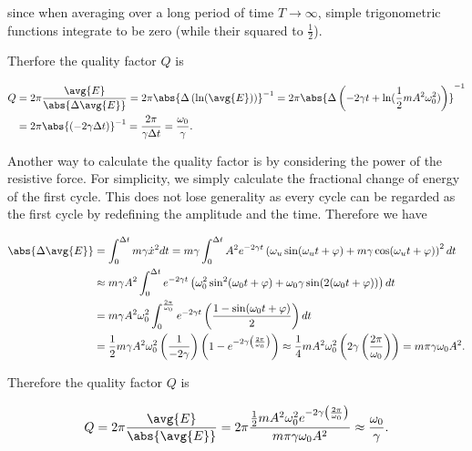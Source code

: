 \documentclass[english,a4paper,12pt]{report}
\begin{document}
since when averaging over a long period of time \(T \to \infty\), simple trigonometric functions integrate to be zero (while their squared to \(\frac{1}{2} \)). 

Therfore the quality factor \(Q\) is 

\begin{equation}
    \begin{aligned} 
    Q &= 2\pi \frac{\avg{E} }{\abs{\Delta \avg{E} } } = 2\pi  \abs{\Delta \left( \ln (\avg{E}  ) \right)}^{-1} = 2\pi \abs{ \Delta \left(-2\gamma t + \ln (\frac{1}{2}mA^2\omega _{0}^2  )\right)}^{-1}  \\
    &= 2\pi \abs{ (-2\gamma \Delta t)}^{-1} = \frac{2\pi }{\gamma \Delta t} = \frac{\omega _{0} }{\gamma }.   
    \end{aligned} 
\end{equation}

Another way to calculate the quality factor is by considering the power of the resistive force. For simplicity, we simply calculate the fractional change of energy of the first cycle. This does not lose generality as every cycle can be regarded as the first cycle by redefining the amplitude and the time. Therefore we have

\begin{equation}
    \begin{aligned} 
    \abs{\Delta \avg{E} }  &= \int_{0}^{\Delta t} m\gamma \dot{x} ^2 dt = m\gamma \int_{0}^{\Delta t} A^2e^{-2\gamma t} \left(  \omega _{u}\sin (\omega _{u}t+\varphi  ) + m\gamma \cos (\omega _{u}t+\varphi  )  \right)^2 dt\\
    &\approx  m\gamma A^2\int_{0}^{\Delta t} e^{-2\gamma t} \left( \omega _{0}^2\sin ^2(\omega _{0}t+\varphi  ) + \omega _{0}\gamma \sin (2(\omega _{0}t+\varphi  )) \right)dt \\
    &= m\gamma A^2 \omega _{0}^2 \int_{0}^{\frac{2\pi }{\omega _{0} } } e^{-2\gamma t} \left( \frac{1-\sin (\omega _{0}t+\varphi  )}{2}  \right)dt \\
    &= \frac{1}{2}m\gamma A^2\omega _{0}^2 \left( \frac{1}{-2\gamma }  \right) \left(1- e^{-2\gamma \left( \frac{2\pi }{\omega _{0} }  \right)} \right)  \approx  \frac{1}{4}mA^2\omega _{0}^2\left(2\gamma \left( \frac{2\pi }{\omega _{0} }  \right)\right) = m\pi \gamma \omega _{0} A^2.  
    \end{aligned} 
\end{equation}

Therefore the quality factor \(Q\) is 

\begin{equation}
    Q = 2\pi \frac{\avg{E} }{\abs{\avg{E} } } = 2\pi \frac{\frac{1}{2}mA^2\omega _{0}^2e^{-2\gamma \left( \frac{2\pi }{\omega _{0} }  \right)}   }{m\pi \gamma \omega _{0}A^2 } \approx \frac{\omega _{0} }{\gamma }. 
\end{equation}
\end{document}
